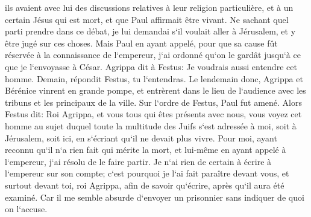 \verse ils avaient avec lui des discussions relatives à leur religion particulière, et à un certain Jésus qui est mort, et que Paul affirmait être vivant. 
\verse Ne sachant quel parti prendre dans ce débat, je lui demandai s`il voulait aller à Jérusalem, et y être jugé sur ces choses. 
\verse Mais Paul en ayant appelé, pour que sa cause fût réservée à la connaissance de l`empereur, j`ai ordonné qu`on le gardât jusqu`à ce que je l`envoyasse à César. 
\verse Agrippa dit à Festus: Je voudrais aussi entendre cet homme. Demain, répondit Festus, tu l`entendras. 
\verse Le lendemain donc, Agrippa et Bérénice vinrent en grande pompe, et entrèrent dans le lieu de l`audience avec les tribuns et les principaux de la ville. Sur l`ordre de Festus, Paul fut amené. 
\verse Alors Festus dit: Roi Agrippa, et vous tous qui êtes présents avec nous, vous voyez cet homme au sujet duquel toute la multitude des Juifs s`est adressée à moi, soit à Jérusalem, soit ici, en s`écriant qu`il ne devait plus vivre. 
\verse Pour moi, ayant reconnu qu`il n`a rien fait qui mérite la mort, et lui-même en ayant appelé à l`empereur, j`ai résolu de le faire partir. 
\verse Je n`ai rien de certain à écrire à l`empereur sur son compte; c`est pourquoi je l`ai fait paraître devant vous, et surtout devant toi, roi Agrippa, afin de savoir qu`écrire, après qu`il aura été examiné. 
\verse Car il me semble absurde d`envoyer un prisonnier sans indiquer de quoi on l`accuse. 

\chapter{}

